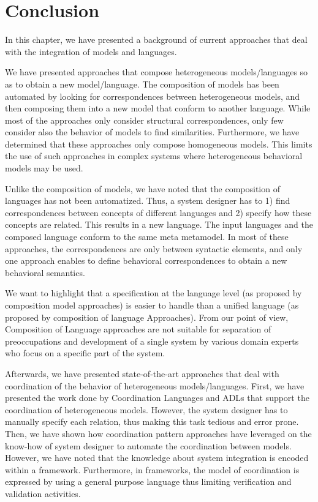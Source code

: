 \section{Conclusion}
In this chapter, we have presented a background of current approaches that deal with the integration of models and languages. 

We have presented approaches that compose heterogeneous models/languages so as to obtain a new model/language. The composition of models has been automated by looking for correspondences between heterogeneous models, and then composing them into a new model that conform to another language. 
While most of the approaches only consider structural correspondences, only few consider also the behavior of models to find similarities. Furthermore, we have determined that these approaches only compose homogeneous models. This limits the use of such approaches in complex systems where heterogeneous behavioral models may be used.

Unlike the composition of models, we have noted that the composition of languages has not been automatized. Thus, a system designer has to 1) find correspondences between concepts of different languages and 2) specify how these concepts are related. This results in a new language. The input languages and the composed language conform to the same meta metamodel. In most of these approaches, the correspondences are only between syntactic elements, and only one approach enables to define behavioral correspondences to obtain a new behavioral semantics.  

We want to highlight that a specification at the language level (as proposed by composition model approaches) is easier to handle than a unified language (as proposed by composition of language Approaches). From our point of view, Composition of Language approaches are not suitable for separation of preoccupations and development of a single system by various domain experts who focus on a specific part of the system.

Afterwards, we have presented state-of-the-art approaches that deal with coordination of the behavior of heterogeneous models/languages. First, we have presented the work done by Coordination Languages and ADLs that support the coordination of heterogeneous models. However, the system designer has to manually specify each relation, thus making this task tedious and error prone. Then, we have shown how coordination pattern approaches have leveraged on the know-how of system designer to automate the coordination between models. However, we have noted that the knowledge about system integration is encoded within a framework. Furthermore, in frameworks, the model of coordination is expressed by using a general purpose language thus limiting verification and validation activities. 


